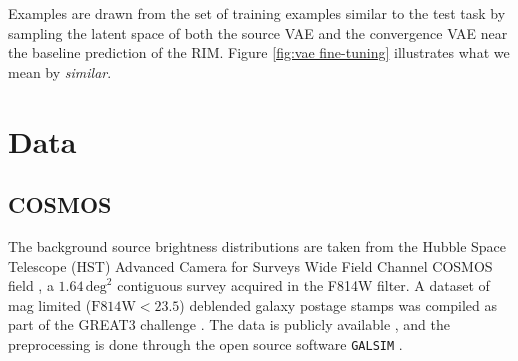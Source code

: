 Examples are drawn from the set of training examples similar to the test task 
by sampling the latent space of both the source 
VAE and the convergence VAE near the baseline prediction of the RIM. Figure \ref{fig:vae fine-tuning} illustrates what we mean by \textit{similar}. 






\section{Data}\label{sec:data}

\subsection{COSMOS}\label{sec:source}
The background source brightness distributions are taken from the Hubble Space Telescope (HST) 
Advanced Camera for Surveys Wide Field Channel COSMOS field \citep{Koekemoer2007,Scoville2007},
a $1.64\,\mathrm{deg}^{2}$ contiguous survey acquired in the F814W filter. 
A dataset of mag limited ($\mathrm{F814W} < 23.5$) deblended galaxy postage stamps \citep{Leauthaud2007} was compiled as 
part of the GREAT3 challenge \citep{Mandelbaum2014}. The data is 
publicly available \citep{Mandelbaum2012}, and the preprocessing is done through the open source software 
\texttt{GALSIM} \citep{Rowe2015}. \par

